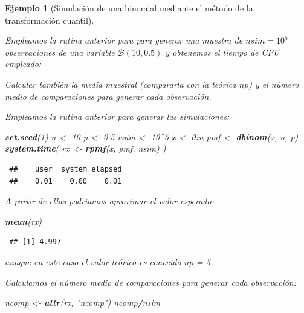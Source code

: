 \documentclass[
  spanish,
  10pt,
]{book}
\newenvironment{Shaded}{\begin{snugshade}}{\end{snugshade}}
\newcommand{\DecValTok}[1]{\textcolor[rgb]{0.00,0.00,0.81}{#1}}
\newcommand{\FloatTok}[1]{\textcolor[rgb]{0.00,0.00,0.81}{#1}}
\newcommand{\FunctionTok}[1]{\textcolor[rgb]{0.13,0.29,0.53}{\textbf{#1}}}
\newcommand{\NormalTok}[1]{#1}
\newcommand{\OtherTok}[1]{\textcolor[rgb]{0.56,0.35,0.01}{#1}}
\newcommand{\SpecialCharTok}[1]{\textcolor[rgb]{0.81,0.36,0.00}{\textbf{#1}}}
\newcommand{\StringTok}[1]{\textcolor[rgb]{0.31,0.60,0.02}{#1}}
\theoremstyle{break}
\newtheorem{example}{Ejemplo}[chapter]
\theoremstyle{nonumberplain}
\begin{document}
\begin{example}[Simulación de una binomial mediante el método de la transformación cuantil]
\protect\hypertarget{exm:binom-cuant}{}\label{exm:binom-cuant}

Empleamos la rutina anterior para para generar una muestra de \(nsim=10^{5}\) observaciones de una variable \(\mathcal{B}(10,0.5)\) y obtenemos el tiempo de CPU empleado:

Calcular también la
media muestral (compararla con la teórica \(np\)) y el número
medio de comparaciones para generar cada observación.

Empleamos la rutina anterior para generar las simulaciones:

\begin{Shaded}
\begin{Highlighting}[]
\FunctionTok{set.seed}\NormalTok{(}\DecValTok{1}\NormalTok{)}
\NormalTok{n }\OtherTok{\textless{}{-}} \DecValTok{10}
\NormalTok{p }\OtherTok{\textless{}{-}} \FloatTok{0.5}
\NormalTok{nsim }\OtherTok{\textless{}{-}} \DecValTok{10}\SpecialCharTok{\^{}}\DecValTok{5}
\NormalTok{x }\OtherTok{\textless{}{-}} \DecValTok{0}\SpecialCharTok{:}\NormalTok{n}
\NormalTok{pmf }\OtherTok{\textless{}{-}} \FunctionTok{dbinom}\NormalTok{(x, n, p)}
\FunctionTok{system.time}\NormalTok{( rx }\OtherTok{\textless{}{-}} \FunctionTok{rpmf}\NormalTok{(x, pmf, nsim) )}
\end{Highlighting}
\end{Shaded}

\begin{verbatim}
 ##    user  system elapsed 
 ##    0.01    0.00    0.01
\end{verbatim}

A partir de ellas podríamos aproximar el valor esperado:

\begin{Shaded}
\begin{Highlighting}[]
\FunctionTok{mean}\NormalTok{(rx)}
\end{Highlighting}
\end{Shaded}

\begin{verbatim}
 ## [1] 4.997
\end{verbatim}

aunque en este caso el valor teórico es conocido \(np\) = 5.

Calculamos el número medio de comparaciones para generar cada observación:

\begin{Shaded}
\begin{Highlighting}[]
\NormalTok{ncomp }\OtherTok{\textless{}{-}} \FunctionTok{attr}\NormalTok{(rx, }\StringTok{"ncomp"}\NormalTok{)}
\NormalTok{ncomp}\SpecialCharTok{/}\NormalTok{nsim}
\end{Highlighting}
\end{Shaded}


\end{example}
\end{document}
